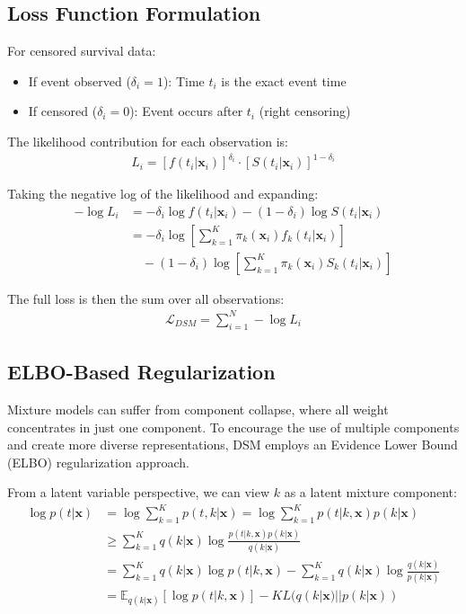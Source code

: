 \subsection{Loss Function Formulation}

For censored survival data:
\begin{itemize}
    \item If event observed ($\delta_i = 1$): Time $t_i$ is the exact event time
    \item If censored ($\delta_i = 0$): Event occurs after $t_i$ (right censoring)
\end{itemize}

The likelihood contribution for each observation is:
\begin{align}
    L_i = [f(t_i|\mathbf{x}_i)]^{\delta_i} \cdot [S(t_i|\mathbf{x}_i)]^{1-\delta_i}
\end{align}

Taking the negative log of the likelihood and expanding:
\begin{align}
    -\log L_i &= -\delta_i \log f(t_i|\mathbf{x}_i) - (1-\delta_i) \log S(t_i|\mathbf{x}_i) \\
    &= -\delta_i \log \left[\sum_{k=1}^{K} \pi_k(\mathbf{x}_i) f_k(t_i|\mathbf{x}_i)\right] \\
    &\quad - (1-\delta_i) \log \left[\sum_{k=1}^{K} \pi_k(\mathbf{x}_i) S_k(t_i|\mathbf{x}_i)\right]
\end{align}

The full loss is then the sum over all observations:
\begin{align}
    \mathcal{L}_{DSM} = \sum_{i=1}^N -\log L_i
\end{align}

\subsection{ELBO-Based Regularization}

Mixture models can suffer from component collapse, where all weight concentrates in just one component. To encourage the use of multiple components and create more diverse representations, DSM employs an Evidence Lower Bound (ELBO) regularization approach.

From a latent variable perspective, we can view $k$ as a latent mixture component:
\begin{align}
    \log p(t|\mathbf{x}) &= \log \sum_{k=1}^K p(t, k|\mathbf{x}) = \log \sum_{k=1}^K p(t|k,\mathbf{x})p(k|\mathbf{x}) \\
    &\geq \sum_{k=1}^K q(k|\mathbf{x}) \log \frac{p(t|k,\mathbf{x})p(k|\mathbf{x})}{q(k|\mathbf{x})} \\
    &= \sum_{k=1}^K q(k|\mathbf{x}) \log p(t|k,\mathbf{x}) - \sum_{k=1}^K q(k|\mathbf{x}) \log \frac{q(k|\mathbf{x})}{p(k|\mathbf{x})} \\
    &= \mathbb{E}_{q(k|\mathbf{x})}[\log p(t|k,\mathbf{x})] - KL(q(k|\mathbf{x})||p(k|\mathbf{x}))
\end{align}

